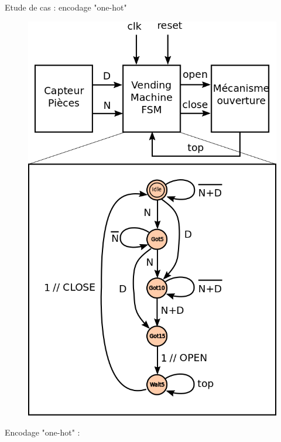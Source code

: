 \documentclass[xcolor=table]{beamer}
\begin{document}
\begin{frame}{Etude de cas : encodage "one-hot"}
  \begin{minipage}{0.4\textwidth}

    \begin{figure}[h]
      \centering
      \includegraphics[scale=0.18]{../../POLY/figures/vending_machine.png}
      \label{fig:vending_machine}
    \end{figure}
  \end{minipage}
  \begin{minipage}{0.4\textwidth}
    \begin{table}[!htbp]
      \centering
      Encodage "one-hot" :

\end{table}
\end{minipage}
\end{frame}
\end{document}
